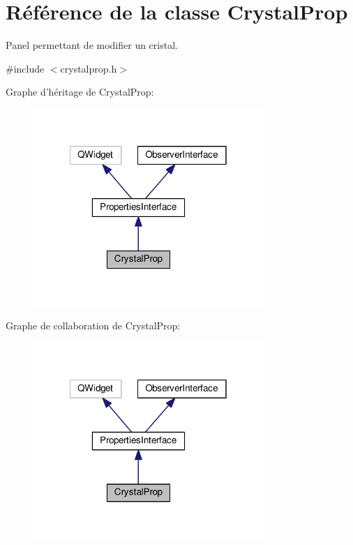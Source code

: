 \hypertarget{classCrystalProp}{\section{Référence de la classe Crystal\+Prop}
\label{classCrystalProp}
}


Panel permettant de modifier un cristal.  




{\ttfamily \#include $<$crystalprop.\+h$>$}



Graphe d'héritage de Crystal\+Prop\+:\nopagebreak
\begin{figure}[H]
\begin{center}
\leavevmode
\includegraphics[width=247pt]{d8/d57/classCrystalProp__inherit__graph}
\end{center}
\end{figure}


Graphe de collaboration de Crystal\+Prop\+:\nopagebreak
\begin{figure}[H]
\begin{center}
\leavevmode
\includegraphics[width=247pt]{d0/d15/classCrystalProp__coll__graph}
\end{center}
\end{figure}
